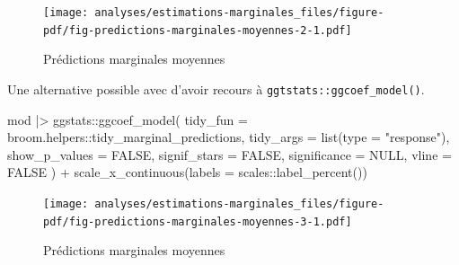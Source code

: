 \documentclass[
  letterpaper,
  DIV=11,
  numbers=noendperiod,
  oneside]{scrreprt}
\newenvironment{Shaded}{\begin{snugshade}}{\end{snugshade}}
\newcommand{\AttributeTok}[1]{\textcolor[rgb]{0.40,0.45,0.13}{#1}}
\newcommand{\ConstantTok}[1]{\textcolor[rgb]{0.56,0.35,0.01}{#1}}
\newcommand{\FunctionTok}[1]{\textcolor[rgb]{0.28,0.35,0.67}{#1}}
\newcommand{\NormalTok}[1]{\textcolor[rgb]{0.00,0.23,0.31}{#1}}
\newcommand{\SpecialCharTok}[1]{\textcolor[rgb]{0.37,0.37,0.37}{#1}}
\newcommand{\StringTok}[1]{\textcolor[rgb]{0.13,0.47,0.30}{#1}}
\begin{document}
\begin{figure}[H]

{\centering \texttt{[image: analyses/estimations-marginales\_files/figure-pdf/fig-predictions-marginales-moyennes-2-1.pdf]}

}

\caption{\label{fig-predictions-marginales-moyennes-2}Prédictions
marginales moyennes}

\end{figure}

Une alternative possible avec d'avoir recours à
\texttt{ggtstats::ggcoef\_model()}.

\begin{Shaded}
\begin{Highlighting}[]
\NormalTok{mod }\SpecialCharTok{|\textgreater{}} 
\NormalTok{  ggstats}\SpecialCharTok{::}\FunctionTok{ggcoef\_model}\NormalTok{(}
    \AttributeTok{tidy\_fun =}\NormalTok{ broom.helpers}\SpecialCharTok{::}\NormalTok{tidy\_marginal\_predictions,}
    \AttributeTok{tidy\_args =} \FunctionTok{list}\NormalTok{(}\AttributeTok{type =} \StringTok{"response"}\NormalTok{),}
    \AttributeTok{show\_p\_values =} \ConstantTok{FALSE}\NormalTok{,}
    \AttributeTok{signif\_stars =} \ConstantTok{FALSE}\NormalTok{,}
    \AttributeTok{significance =} \ConstantTok{NULL}\NormalTok{,}
    \AttributeTok{vline =} \ConstantTok{FALSE}
\NormalTok{  ) }\SpecialCharTok{+}
  \FunctionTok{scale\_x\_continuous}\NormalTok{(}\AttributeTok{labels =}\NormalTok{ scales}\SpecialCharTok{::}\FunctionTok{label\_percent}\NormalTok{())}
\end{Highlighting}
\end{Shaded}

\begin{figure}[H]

{\centering \texttt{[image: analyses/estimations-marginales\_files/figure-pdf/fig-predictions-marginales-moyennes-3-1.pdf]}

}

\caption{\label{fig-predictions-marginales-moyennes-3}Prédictions
marginales moyennes}

\end{figure}
\end{document}

